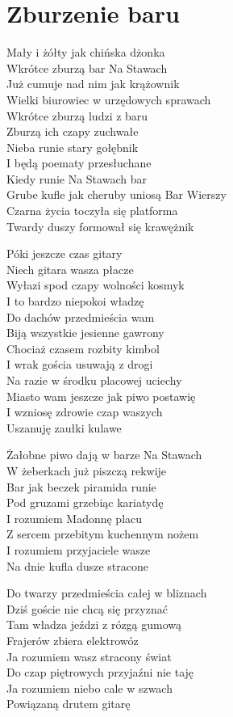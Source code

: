 \section{Zburzenie baru}
\begin{text}
Mały i żółty jak chińska dżonka\\
Wkrótce  zburzą bar Na Stawach\\
Już cumuje nad nim jak krążownik\\
Wielki biurowiec w urzędowych sprawach\\
\vin Wkrótce zburzą ludzi z baru\\
\vin Zburzą ich czapy zuchwałe\\
\vin Nieba runie stary gołębnik\\
\vin I będą poematy przesłuchane\\
Kiedy runie Na Stawach bar\\
Grube kufle jak cheruby uniosą Bar Wierszy\\
Czarna życia toczyła się platforma\\
Twardy duszy formował się krawężnik

\vin Póki jeszcze czas gitary\\
\vin Niech gitara wasza płacze\\
\vin Wyłazi spod czapy wolności kosmyk\\
\vin I to bardzo niepokoi władzę\\
\vin Do dachów przedmieścia wam\\
\vin Biją wszystkie jesienne gawrony\\
\vin Chociaż czasem rozbity kimbol\\
\vin I wrak gościa usuwają z drogi\\
\vin Na razie w środku placowej uciechy\\
\vin Miasto wam jeszcze jak piwo postawię\\
\vin I wzniosę zdrowie czap waszych\\
\vin Uszanuję zaułki kulawe

Żałobne piwo dają w barze Na Stawach\\
W żeberkach już piszczą rekwije\\
Bar jak beczek piramida runie\\
Pod gruzami grzebiąc kariatydę\\
\vin I rozumiem Madonnę placu\\
\vin Z sercem przebitym kuchennym nożem\\
\vin I rozumiem przyjaciele wasze\\
\vin Na dnie kufla dusze stracone

Do twarzy przedmieścia całej w bliznach\\
Dziś goście nie chcą się przyznać\\
Tam władza jeździ z rózgą gumową\\
Frajerów zbiera elektrowóz\\
\vin Ja rozumiem wasz stracony świat\\
\vin Do czap piętrowych przyjaźni nie taję\\
\vin Ja rozumiem niebo cale w szwach\\
\vin Powiązaną drutem gitarę
\end{text}
